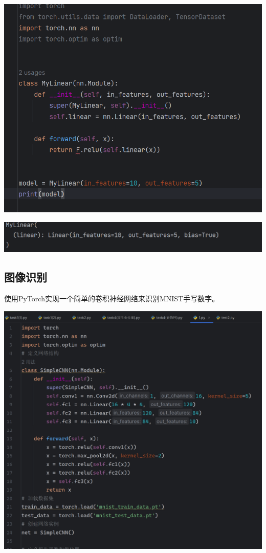 \documentclass[UTF8,a4paper]{ctexart}
\begin{document}
\begin{sloppypar}
	\includegraphics[width = 14cm]{33}
	
	\includegraphics[width = 14cm]{34}
	
	\subsection{图像识别}
	使用PyTorch实现一个简单的卷积神经网络来识别MNIST手写数字。
	
	\includegraphics[width = 14cm]{35}
	

\end{sloppypar}
\end{document}
